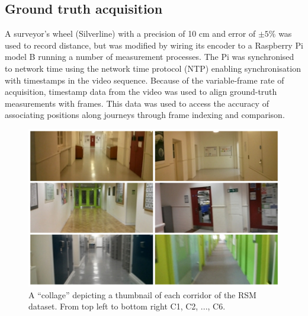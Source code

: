 \subsection{Ground truth acquisition}

A surveyor's wheel (Silverline) with a precision of 10 cm and error of $\pm 5\%$ was used to record distance, but was modified by wiring its encoder to a Raspberry Pi model B running a number of measurement processes. The Pi was synchronised to network time using the network time protocol (NTP) enabling synchronisation with timestamps in the video sequence.  Because of the variable-frame rate of acquisition, timestamp data from the video was used to align ground-truth measurements with frames. This data was used to access the accuracy of associating positions along journeys through frame indexing and comparison.


\begin{figure}[t]
\centering
\includegraphics[width=\linewidth]{./gfx/Chapter04/rsm_collage.jpg}
\caption{A ``collage'' depicting a thumbnail of each corridor of the RSM dataset. From top left to bottom right C1, C2, ..., C6.}
\label{fig:RSMcollage}
\end{figure}


